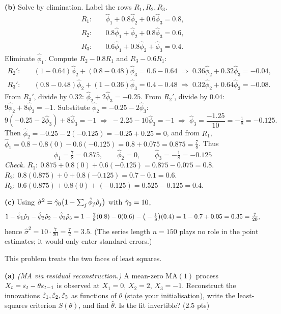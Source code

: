 \documentclass[11pt]{article}
\begin{document}
\textbf{(b)} Solve by elimination. Label the rows $R_1,R_2,R_3$.
\[
\begin{aligned}
R_1:&\quad \hat\phi_1+0.8\hat\phi_2+0.6\hat\phi_3=0.8,\\
R_2:&\quad 0.8\hat\phi_1+\hat\phi_2+0.8\hat\phi_3=0.6,\\
R_3:&\quad 0.6\hat\phi_1+0.8\hat\phi_2+\hat\phi_3=0.4 .
\end{aligned}
\]
Eliminate $\hat\phi_1$. Compute $R_2-0.8R_1$ and $R_3-0.6R_1$:
\[
\begin{aligned}
R_2':&\quad (1-0.64)\hat\phi_2+(0.8-0.48)\hat\phi_3=0.6-0.64
\;\Rightarrow\; 0.36\hat\phi_2+0.32\hat\phi_3=-0.04,\\
R_3':&\quad (0.8-0.48)\hat\phi_2+(1-0.36)\hat\phi_3=0.4-0.48
\;\Rightarrow\; 0.32\hat\phi_2+0.64\hat\phi_3=-0.08 .
\end{aligned}
\]
From $R_3'$, divide by $0.32$: $\hat\phi_2+2\hat\phi_3=-0.25$. From $R_2'$,
divide by $0.04$: $9\hat\phi_2+8\hat\phi_3=-1$. Substitute
$\hat\phi_2=-0.25-2\hat\phi_3$:
\[
9(-0.25-2\hat\phi_3)+8\hat\phi_3=-1
\;\Rightarrow\;
-2.25-10\hat\phi_3=-1
\;\Rightarrow\;
\hat\phi_3=\frac{-1.25}{10}=-\tfrac18=-0.125 .
\]
Then $\hat\phi_2=-0.25-2(-0.125)=-0.25+0.25=0$, and from $R_1$,
$\hat\phi_1=0.8-0.8(0)-0.6(-0.125)=0.8+0.075=0.875=\tfrac78$. Thus
\[
\boxed{\;\hat\phi_1=\tfrac78=0.875,\qquad \hat\phi_2=0,\qquad \hat\phi_3=-\tfrac18=-0.125\;}
\]
\textit{Check.}
$R_1:\ 0.875+0.8(0)+0.6(-0.125)=0.875-0.075=0.8$.\ \checkmark\;
$R_2:\ 0.8(0.875)+0+0.8(-0.125)=0.7-0.1=0.6$.\ \checkmark\;
$R_3:\ 0.6(0.875)+0.8(0)+(-0.125)=0.525-0.125=0.4$.\ \checkmark

\textbf{(c)} Using $\hat\sigma^2=\hat{\gamma}_0\big(1-\sum_j\hat\phi_j\hat{\rho}_j\big)$
with $\hat{\gamma}_0=10$,
\[
1-\hat\phi_1\hat{\rho}_1-\hat\phi_2\hat{\rho}_2-\hat\phi_3\hat{\rho}_3
=1-\tfrac78(0.8)-0(0.6)-\big(-\tfrac18\big)(0.4)
=1-0.7+0.05=0.35=\tfrac{7}{20},
\]
hence $\hat\sigma^2=10\cdot\tfrac{7}{20}=\tfrac72=3.5$.
(The series length $n=150$ plays no role in the point estimates; it would only
enter standard errors.)

\statementstart
This problem treats the two faces of least squares.

\textbf{(a)} \emph{(MA via residual reconstruction.)} A mean-zero $\mathrm{MA}(1)$ process $X_t=\varepsilon_t-\theta\varepsilon_{t-1}$ is observed at $X_1=0$, $X_2=2$, $X_3=-1$. Reconstruct the innovations $\hat{\varepsilon}_1,\hat{\varepsilon}_2,\hat{\varepsilon}_3$ as functions of $\theta$ (state your initialisation), write the least-squares criterion $S(\theta)$, and find $\hat\theta$. Is the fit invertible? \hfill(2.5 pts)
\end{document}
